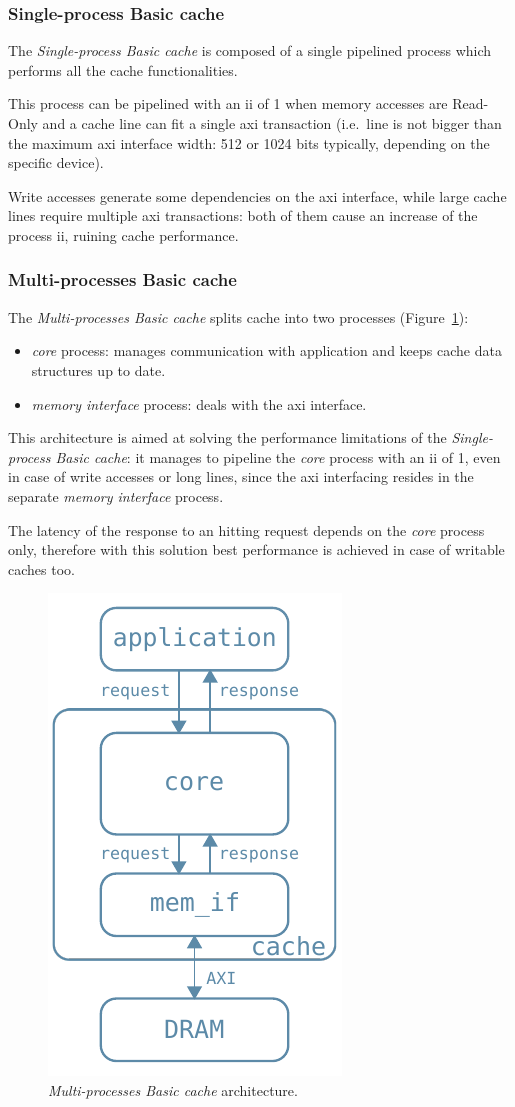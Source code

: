 \documentclass[11pt,a4paper,oneside]{memoir}
\begin{document}
\subsubsection{Single-process Basic cache}
The \emph{Single-process Basic cache} is composed of a single pipelined process
which performs all the cache functionalities.

This process can be pipelined with an \ac{ii} of 1 when memory accesses are
Read-Only and a cache line can fit a single \ac{axi} transaction (i.e.\ line is
not bigger than the maximum \ac{axi} interface width: 512 or 1024 bits
typically, depending on the specific device).

Write accesses generate some dependencies on the \ac{axi} interface, while large
cache lines require multiple \ac{axi} transactions: both of them cause an
increase of the process \ac{ii}, ruining cache performance.

\subsubsection{Multi-processes Basic cache}
The \emph{Multi-processes Basic cache} splits cache into two processes
(Figure~\ref{fig:multi_proc_basic_arch}):
\begin{itemize}
	\item \emph{core} process: manages communication with application and
		keeps cache data structures up to date.
	\item \emph{memory interface} process: deals with the \ac{axi}
		interface.
\end{itemize}

This architecture is aimed at solving the performance limitations of the
\emph{Single-process Basic cache}: it manages to pipeline the \emph{core}
process with an \ac{ii} of 1, even in case of write accesses or long lines,
since the \ac{axi} interfacing resides in the separate \emph{memory interface}
process.

The latency of the response to an hitting request depends on the \emph{core}
process only, therefore with this solution best performance is achieved in case
of writable caches too.

\begin{figure}
	\centering
	\includegraphics[width=.3\textwidth]{multi_proc_basic_arch}
	\caption{\emph{Multi-processes Basic cache} architecture.}
	\label{fig:multi_proc_basic_arch}
\end{figure}
\end{document}
